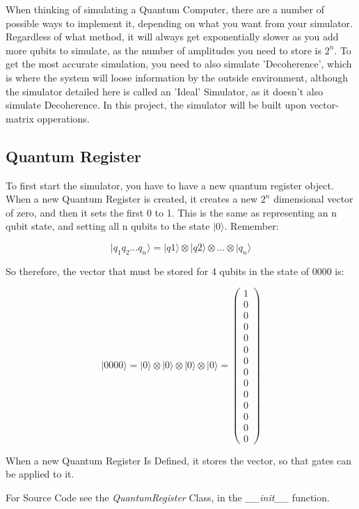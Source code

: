 \documentclass[../main.tex]{subfiles}
\begin{document}
When thinking of simulating a Quantum Computer, there are a number of possible ways to implement it, depending on what you want from your simulator.
Regardless of what method, it will always get exponentially slower as you add more qubits to simulate, as the number of amplitudes you need to store is \(2^n\). 
To get the most accurate simulation, you need to also simulate 'Decoherence', which is where the system will loose information by the outside environment, although the simulator detailed here is called an 'Ideal' Simulator, as it doesn't also simulate Decoherence.
In this project, the simulator will be built upon vector-matrix opperations.

\subsection{Quantum Register}
To first start the simulator, you have to have a new quantum register object. When a new Quantum Register is created, it creates a new \(2^n\) dimensional vector of zero, and then it sets the first 0 to 1. This is the same as representing an n qubit state, and setting all n qubits to the state \(\lvert0\rangle\). Remember:

$$
\lvert q_1 q_2...q_n \rangle = \lvert q1 \rangle \otimes \lvert q2 \rangle \otimes ... \otimes \lvert q_n \rangle
$$

So therefore, the vector that must be stored for 4 qubits in the state of 0000 is:

$$
\lvert0000\rangle = \lvert0\rangle \otimes \lvert0\rangle \otimes \lvert0\rangle \otimes \lvert0\rangle = \left( \begin{matrix} 1 \\ 0 \\ 0 \\ 0 \\ 0 \\ 0 \\ 0 \\ 0 \\ 0 \\ 0 \\ 0 \\ 0 \\ 0 \\ 0 \end{matrix} \right)
$$

When a new Quantum Register Is Defined, it stores the vector, so that gates can be applied to it.

For Source Code see the \emph{QuantumRegister} Class, in the \emph{\_\_init\_\_} function.
\end{document}

